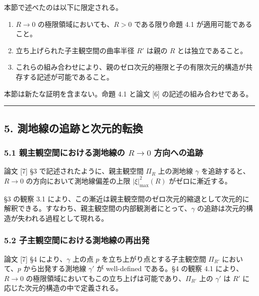 \documentclass[a4paper,11pt]{ltjsarticle}
\theoremstyle{definition}
\providecommand{\tightlist}{\setlength{\itemsep}{0pt}\setlength{\parskip}{0pt}}
\begin{document}
本節で述べたのは以下に限定される。

\begin{enumerate}
\def\labelenumi{\arabic{enumi}.}
\tightlist
\item
  \(R \to 0\) の極限領域においても、\(R > 0\) である限り命題 4.1
  が適用可能であること。
\item
  立ち上げられた子主観空間の曲率半径 \(R'\) は親の \(R\)
  とは独立であること。
\item
  これらの組み合わせにより、親のゼロ次元的極限と子の有限次元的構造が共存する記述が可能であること。
\end{enumerate}

本節は新たな証明を含まない。命題 4.1 と論文 {[}6{]}
の記述の組み合わせである。

\begin{center}\rule{0.5\linewidth}{0.5pt}\end{center}

\subsection{5.
測地線の追跡と次元的転換}\label{ux6e2cux5730ux7ddaux306eux8ffdux8de1ux3068ux6b21ux5143ux7684ux8ee2ux63db}

\subsubsection{\texorpdfstring{5.1 親主観空間における測地線の
\(R \to 0\)
方向への追跡}{5.1 親主観空間における測地線の R \textbackslash to 0 方向への追跡}}\label{ux89aaux4e3bux89b3ux7a7aux9593ux306bux304aux3051ux308bux6e2cux5730ux7ddaux306e-r-to-0-ux65b9ux5411ux3078ux306eux8ffdux8de1}

論文 {[}7{]} §3 で記述されたように、親主観空間 \(\Pi_R\) 上の測地線
\(\gamma\) を追跡すると、\(R \to 0\) の方向において測地線偏差の上限
\(|\xi|^2_{\max}(R)\) がゼロに漸近する。

§3 の観察 3.1
により、この漸近は親主観空間のゼロ次元的縮退として次元的に解釈できる。すなわち、親主観空間の内部観測者にとって、\(\gamma\)
の追跡は次元的構造が失われる過程として現れる。

\subsubsection{5.2
子主観空間における測地線の再出発}\label{ux5b50ux4e3bux89b3ux7a7aux9593ux306bux304aux3051ux308bux6e2cux5730ux7ddaux306eux518dux51faux767a}

論文 {[}7{]} §4 により、\(\gamma\) 上の点 \(p\)
を立ち上がり点とする子主観空間 \(\Pi_{R'}\) において、\(p\)
から出発する測地線 \(\gamma'\) が well-defined である。§4 の観察 4.1
により、\(R \to 0\)
の極限領域においてもこの立ち上げは可能であり、\(\Pi_{R'}\) 上の
\(\gamma'\) は \(R'\) に応じた次元的構造の中で定義される。
\end{document}
